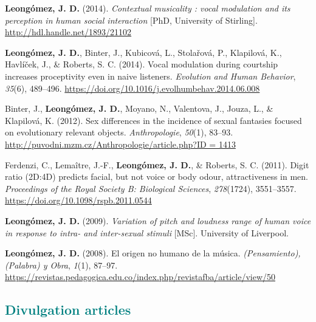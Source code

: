 \documentclass[11pt,a4paper,]{awesome-cv}
\begin{document}
\leavevmode{}%
\textbf{Leongómez, J. D.} (2014). \emph{{Contextual musicality : vocal
modulation and its perception in human social interaction}} {[}PhD,
University of Stirling{]}. \url{http://hdl.handle.net/1893/21102}

\leavevmode{}%
\textbf{Leongómez, J. D.}, Binter, J., Kubicová, L., Stolařová, P.,
Klapilová, K., Havlíček, J., \& Roberts, S. C. (2014). {Vocal modulation
during courtship increases proceptivity even in naive listeners}.
\emph{Evolution and Human Behavior}, \emph{35}(6), 489--496.
\url{https://doi.org/10.1016/j.evolhumbehav.2014.06.008}

\leavevmode{}%
Binter, J., \textbf{Leongómez, J. D.}, Moyano, N., Valentova, J., Jouza,
L., \& Klapilová, K. (2012). {Sex differences in the incidence of sexual
fantasies focused on evolutionary relevant objects.}
\emph{Anthropologie}, \emph{50}(1), 83--93.
\href{http://puvodni.mzm.cz/Anthropologie/article.php?ID\%20=\%201413}{http://puvodni.mzm.cz/Anthropologie/article.php?ID
= 1413}

\leavevmode{}%
Ferdenzi, C., Lemaître, J.-F., \textbf{Leongómez, J. D.}, \& Roberts, S.
C. (2011). {Digit ratio (2D:4D) predicts facial, but not voice or body
odour, attractiveness in men.} \emph{Proceedings of the Royal Society B:
Biological Sciences}, \emph{278}(1724), 3551--3557.
\url{https://doi.org/10.1098/rspb.2011.0544}

\leavevmode{}%
\textbf{Leongómez, J. D.} (2009). \emph{{Variation of pitch and loudness
range of human voice in response to intra- and inter-sexual stimuli}}
{[}MSc{]}. University of Liverpool.

\leavevmode{}%
\textbf{Leongómez, J. D.} (2008). {El origen no humano de la m{ú}sica}.
\emph{(Pensamiento), (Palabra) y Obra}, \emph{1}(1), 87--97.
\url{https://revistas.pedagogica.edu.co/index.php/revistafba/article/view/50}

\endgroup

\hypertarget{section-2}{%
\subsection{\texorpdfstring{\textcolor{teal}{Divulgation articles}}{}}\label{section-2}}

\begingroup
\setlength{\parindent}{-0.5in}
\setlength{\leftskip}{0.5in}
\end{document}
